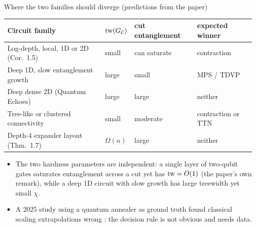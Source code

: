 \begin{frame}{Where the two families should diverge (predictions from the paper)}
    \begin{center}
    \begin{tabular}{L{3.2cm} C{2.4cm} C{2.4cm} C{2.6cm}}
        \textbf{Circuit family} & $\operatorname{tw}(G_{\mathcal{C}})$ & cut entanglement & \textbf{expected winner} \\ \hline
        Log-depth, local, 1D or 2D (Cor.~1.5) & small & can saturate & contraction \\
        Deep 1D, slow entanglement growth & large & small & MPS / TDVP \\
        Deep dense 2D (Quantum Echoes) & large & large & neither \\
        Tree-like or clustered connectivity & small & moderate & contraction or TTN \\
        Depth-4 expander layout (Thm.~1.7) & $\Omega(n)$ & large & neither
    \end{tabular}
    \end{center}
    \begin{itemize}
        \item The two hardness parameters are independent: a single layer of two-qubit gates saturates entanglement across a cut yet has $\operatorname{tw}=O(1)$ (the paper's own remark), while a deep 1D circuit with slow growth has large treewidth yet small $\chi$.
        \item A 2025 study using a quantum annealer as ground truth found classical scaling extrapolations wrong \parencite{evalqpu2025}: the decision rule is not obvious and needs data.
    \end{itemize}
\end{frame}

